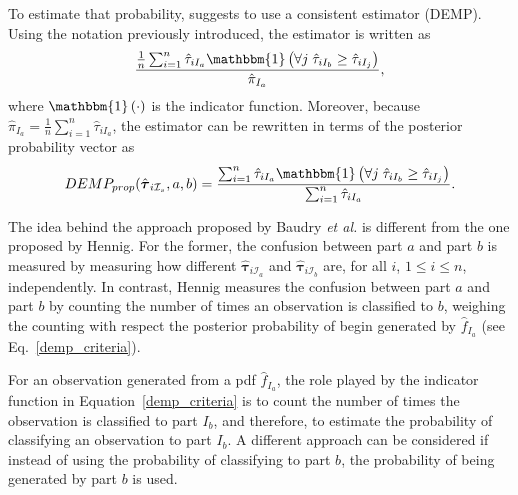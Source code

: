 \documentclass[10pt, a4paper]{article}
\newcommand{\m}[1]{\boldsymbol{#1}}
\begin{document}
To estimate that probability,  \cite{hennig2010methods} suggests to use a consistent estimator (DEMP). Using the notation previously introduced, the estimator is written as
\[
\frac{ \frac{1}{n} \sum_{i=1}^n {\hat{\tau}_{iI_a} \mathbbm{1}\left( \forall j\; \hat{\tau}_{i I_{b}} \geq \hat{\tau}_{iI_j} \right)}}{ \hat{\pi}_{I_a}},
\]
where $\mathbbm{1}\left( \cdot \right)$ is the indicator function. Moreover, because $ \hat{\pi}_{I_a} = \frac{1}{n} \sum_{i=1}^n \hat{\tau}_{iI_a}$, the estimator can be rewritten in terms of the posterior probability vector as
\begin{equation}\label{demp_criteria}
DEMP_{prop}(\hat{\m \tau}_{i \mathcal{I}_s}, a, b) =\frac{ \sum_{i=1}^n {\hat{\tau}_{iI_a} \mathbbm{1}\left( \forall j\; \hat{\tau}_{i I_{b}} \geq \hat{\tau}_{iI_j} \right)}}{\sum_{i=1}^n \hat{\tau}_{iI_a} }.
\end{equation}

The idea behind the approach proposed by Baudry \emph{et al.} is different from the one proposed by Hennig. For the former, the confusion between part $a$ and part $b$ is measured by measuring how different $\hat{\m \tau}_{i \mathcal{I}_a}$ and $\hat{\m \tau}_{i \mathcal{I}_b}$ are, for all $i$, $1\leq i \leq n$, independently. In contrast, Hennig measures the confusion between part $a$ and part $b$ by counting the number of times an observation is classified to $b$, weighing the counting with respect the posterior probability of begin generated by $\hat{f}_{I_a}$ (see Eq.~\ref{demp_criteria}).



For an observation generated from a pdf $\hat{f}_{I_a}$, the role played by the indicator function in Equation~\ref{demp_criteria} is to count the number of times the observation is classified to part $I_b$, and therefore, to estimate the probability of classifying an observation to part $I_b$. A different approach can be considered if instead of using the probability of classifying to part $b$, the probability of being generated by part $b$ is used.
\end{document}
